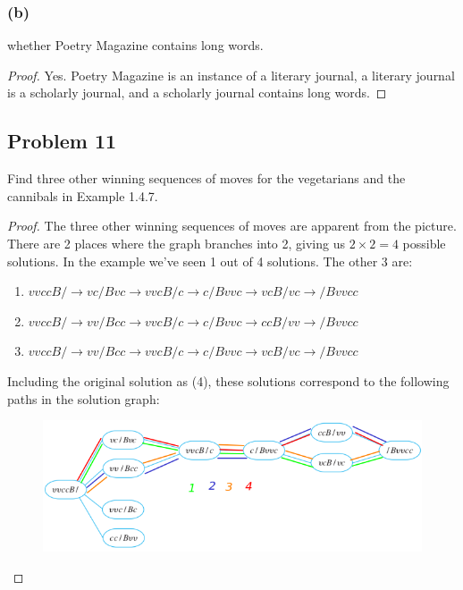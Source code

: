 \documentclass[14pt]{extarticle}
\begin{document}
\subsubsection{(b)}
whether Poetry Magazine contains long words.

\begin{proof}
Yes. Poetry Magazine is an instance of a literary journal, a literary journal is
a scholarly journal, and a scholarly journal contains long words.
\end{proof}

\subsection{Problem 11}
Find three other winning sequences of moves for the vegetarians and the
cannibals in Example 1.4.7.

\begin{proof}
The three other winning sequences of moves are apparent from the picture.
There are 2 places where the graph branches into 2, giving us $2 \times 2 = 4$
possible solutions. In the example we've seen 1 out of 4 solutions. The other 3
are:
\begin{enumerate}
\item $vvccB/ \to vc/Bvc \to vvcB/c \to c/Bvvc \to vcB/vc \to /Bvvcc$
\item $vvccB/ \to vv/Bcc \to vvcB/c \to c/Bvvc \to ccB/vv \to /Bvvcc$
\item $vvccB/ \to vv/Bcc \to vvcB/c \to c/Bvvc \to vcB/vc \to /Bvvcc$
\end{enumerate}

Including the original solution as (4), these solutions correspond to the
following paths in the solution graph:

\begin{figure}[ht!]
\centering
\includegraphics[scale=0.75]{../images/1.4.11.png}
\end{figure}
\end{proof}
\end{document}
